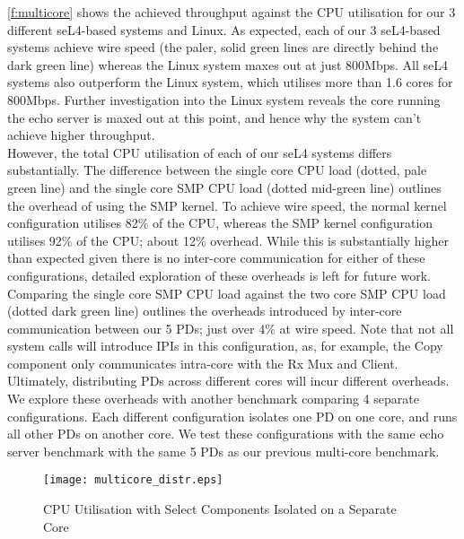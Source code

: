 \autoref{f:multicore} shows the achieved throughput against the CPU utilisation for our 3 different seL4-based systems and Linux. 
As expected, each of our 3 seL4-based systems achieve wire speed (the paler, solid green lines are directly behind the dark green line)
whereas the Linux system maxes out at just 800Mbps. All seL4 systems also outperform the Linux system, which utilises more than
1.6 cores for 800Mbps. Further investigation into the Linux system reveals the core running the echo server is maxed out at 
this point, and hence why the system can't achieve higher throughput. \\
However, the total CPU utilisation of each of our seL4 systems differs substantially. 
The difference between the single core CPU load (dotted, pale green line) and the single core SMP CPU load (dotted mid-green line) 
outlines the overhead of using the SMP kernel. To achieve wire speed, the normal kernel configuration utilises 82\% of the CPU, whereas
the SMP kernel configuration utilises 92\% of the CPU; about 12\% overhead. While this is substantially higher than expected given
there is no inter-core communication for either of these configurations, detailed
exploration of these overheads is left for future work. 
Comparing the single core SMP CPU load against the two core SMP CPU load (dotted dark green line) outlines the overheads introduced by
inter-core communication between our 5 PDs; just over 4\% at wire speed. Note that not all system calls will introduce IPIs in
this configuration, as, for example, the Copy component only communicates intra-core with the Rx Mux and Client. \\

Ultimately, distributing PDs across different cores will incur different overheads. We explore these overheads with another benchmark
comparing 4 separate configurations. Each different configuration isolates one PD on one core, and runs all other PDs on another core. 
We test these configurations with the same echo server benchmark with the same 5 PDs as our previous multi-core benchmark.

\begin{figure}[H]
    \centering
    \texttt{[image: multicore\_distr.eps]}
    \caption{CPU Utilisation with Select Components Isolated on a Separate Core}
    \label{f:multicore_distr}
\end{figure}

